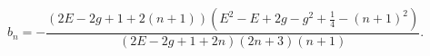 \begin{equation}
   b_n = -\frac{\left(2E-2g+ 1 +2 \left(n+1 \right) \right) 
\left(E^2-E+ 2g - g^2 + \tfrac{1}{4} -
   \left(n+1 \right)^2\right)}{\left(2E-2g+1+2n\right) \left(2n+3
   \right)\left(n+1\right)}. 
\end{equation} 
